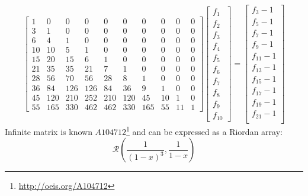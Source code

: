 \documentclass[a4paper,dottedtoc,headinclude,footinclude]{report} %
\theoremstyle{plain}
\begin{document}
    \begin{displaymath}
        \left[
        \begin{array}{cccccccccc}
            1 & 0 & 0 & 0 & 0 & 0 & 0 & 0 & 0 & 0\\
            3 & 1 & 0 & 0 & 0 & 0 & 0 & 0 & 0 & 0\\
            6 & 4 & 1 & 0 & 0 & 0 & 0 & 0 & 0 & 0\\
            10 & 10 & 5 & 1 & 0 & 0 & 0 & 0 & 0 & 0\\
            15 & 20 & 15 & 6 & 1 & 0 & 0 & 0 & 0 & 0\\
            21 & 35 & 35 & 21 & 7 & 1 & 0 & 0 & 0 & 0\\
            28 & 56 & 70 & 56 & 28 & 8 & 1 & 0 & 0 & 0\\
            36 & 84 & 126 & 126 & 84 & 36 & 9 & 1 & 0 & 0\\
            45 & 120 & 210 & 252 & 210 & 120 & 45 & 10 & 1 & 0\\
            55 & 165 & 330 & 462 & 462 & 330 & 165 & 55 & 11 & 1
            \end{array}\right]  \left[
            \begin{array}{c}
                f_{1}\\
                f_{2}\\
                f_{3}\\
                f_{4}\\
                f_{5}\\
                f_{6}\\
                f_{7}\\
                f_{8}\\
                f_{9}\\
                f_{10}\end{array}\right] = \left[
            \begin{array}{c}
                f_{3} - 1\\
                f_{5} - 1\\
                f_{7} - 1\\
                f_{9} - 1\\
                f_{11} - 1\\
                f_{13} - 1\\
                f_{15} - 1\\
                f_{17} - 1\\
                f_{19} - 1\\
                f_{21} - 1\\
                \end{array}\right]
    \end{displaymath}
    Infinite matrix is known $A104712$\footnote{\url{http://oeis.org/A104712}}
    and can be expressed as a Riordan array:
    \begin{displaymath}
        \mathcal{R}\left(\frac{1}{(1-x)^3}, \frac{1}{1-x}\right)
    \end{displaymath}
    
\end{document}
